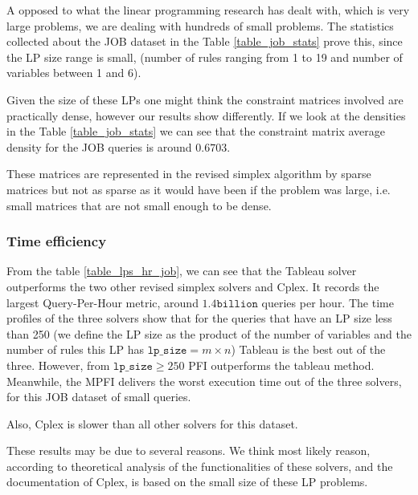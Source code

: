 A opposed to what the linear programming research has dealt with, which is
very large problems, we are dealing with hundreds of small problems. The statistics
collected about the JOB dataset in the Table \ref{table_job_stats} prove this, since the LP size range is small, (number
of rules ranging from 1 to 19 and number of variables between 1 and 6).

Given the size of these LPs one might think the constraint matrices involved
are practically dense, however our results show differently. If we look at the densities
in the Table \ref{table_job_stats} we can see that the constraint matrix average density
for the JOB queries is around $0.6703$.

These matrices are represented
in the revised simplex algorithm by
sparse matrices but not as sparse as it would have been if the problem was large, i.e.
small matrices that are not small enough to be dense.

\subsubsection{Time efficiency}
From the table \ref{table_lps_hr_job}, we can see that the Tableau solver
outperforms the two other revised simplex solvers and Cplex. It records
the largest Query-Per-Hour metric, around $ 1.4 \texttt{billion}$ queries per hour.
The time profiles of the three solvers show that for the queries that have
an LP size less than 250 (we define the LP size as the product of the number 
of variables and the number of rules this LP has $\texttt{lp\_size} = m \times n$)
Tableau is the best out of the three. 
However, from $\texttt{lp\_size} \geq 250$ PFI outperforms the tableau method.
Meanwhile, the MPFI delivers the worst execution time out of the three solvers, for
this JOB dataset of small queries. 

Also, Cplex is slower than all other solvers for this dataset.

These results may be due to several reasons. We think most likely reason,
according to theoretical analysis of the functionalities of these solvers, and the documentation
of Cplex, is based on the small size of these LP problems.

